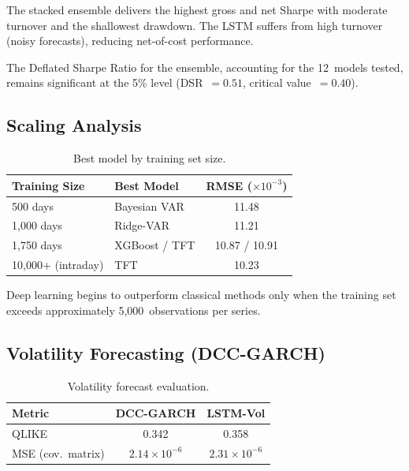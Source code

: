 \documentclass[11pt,a4paper,twocolumn]{article}
\begin{document}
The stacked ensemble delivers the highest gross and net Sharpe with moderate
turnover and the shallowest drawdown.  The LSTM suffers from high turnover
(noisy forecasts), reducing net-of-cost performance.

The Deflated Sharpe Ratio for the ensemble, accounting for the 12~models
tested, remains significant at the 5\% level (DSR~$= 0.51$, critical
value~$= 0.40$).

\subsection{Scaling Analysis}

\begin{table}[H]
\centering
\caption{Best model by training set size.}
\label{tab:scaling}
\small
\begin{tabular}{@{}llc@{}}
\toprule
\textbf{Training Size} & \textbf{Best Model} & \textbf{RMSE} ($\times 10^{-3}$) \\
\midrule
500 days        & Bayesian VAR    & 11.48 \\
1,000 days      & Ridge-VAR       & 11.21 \\
1,750 days      & XGBoost / TFT   & 10.87 / 10.91 \\
10,000+ (intraday) & TFT          & 10.23 \\
\bottomrule
\end{tabular}
\end{table}

Deep learning begins to outperform classical methods only when the training set
exceeds approximately 5{,}000~observations per series.

\subsection{Volatility Forecasting (DCC-GARCH)}

\begin{table}[H]
\centering
\caption{Volatility forecast evaluation.}
\label{tab:vol}
\small
\begin{tabular}{@{}lcc@{}}
\toprule
\textbf{Metric} & \textbf{DCC-GARCH} & \textbf{LSTM-Vol} \\
\midrule
QLIKE                & 0.342  & 0.358 \\
MSE (cov.\ matrix)   & $2.14 \times 10^{-6}$ & $2.31 \times 10^{-6}$ \\
\bottomrule
\end{tabular}
\end{table}
\end{document}
